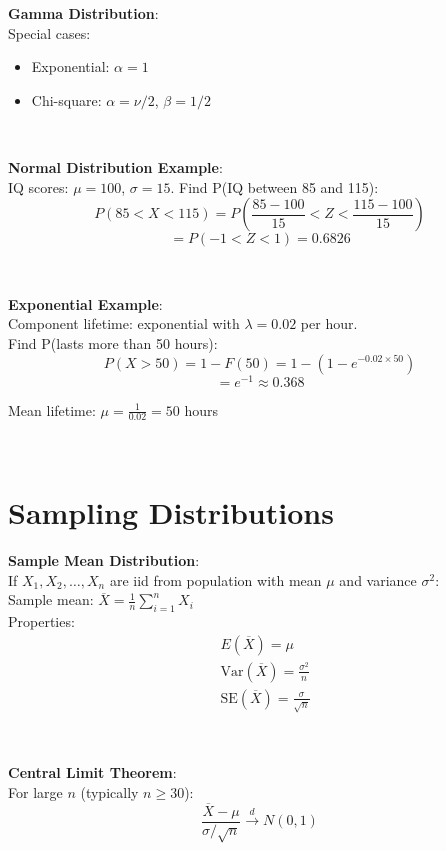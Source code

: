 \documentclass{article}
\newenvironment{cheatformula}[1][Title]{
    \begin{minipage}{\linewidth}
    \textbf{#1}:\\
}{
    \end{minipage}\\[2ex]
}
\begin{document}
\begin{multicols*}{2}
\begin{cheatformula}[Gamma Distribution]
    Special cases:
    \begin{itemize}
        \item Exponential: $\alpha = 1$
        \item Chi-square: $\alpha = \nu/2$, $\beta = 1/2$
    \end{itemize}
\end{cheatformula}

\begin{cheatformula}[Normal Distribution Example]
    IQ scores: $\mu = 100$, $\sigma = 15$. Find P(IQ between 85 and 115):
    $$P(85 < X < 115) = P\left(\frac{85-100}{15} < Z < \frac{115-100}{15}\right)$$
    $$= P(-1 < Z < 1) = 0.6826$$
\end{cheatformula}

\begin{cheatformula}[Exponential Example]
    Component lifetime: exponential with $\lambda = 0.02$ per hour.\\
    Find P(lasts more than 50 hours):
    $$P(X > 50) = 1 - F(50) = 1 - (1 - e^{-0.02 \times 50})$$
    $$= e^{-1} \approx 0.368$$
    
    Mean lifetime: $\mu = \frac{1}{0.02} = 50$ hours
\end{cheatformula}

\section{Sampling Distributions}

\begin{cheatformula}[Sample Mean Distribution]
    If $X_1, X_2, \ldots, X_n$ are iid from population with mean $\mu$ and variance $\sigma^2$:\\
    Sample mean: $\overline{X} = \frac{1}{n}\sum_{i=1}^n X_i$\\
    
    Properties:
    \begin{align*}
        &E(\overline{X}) = \mu\\
        &\text{Var}(\overline{X}) = \frac{\sigma^2}{n}\\
        &\text{SE}(\overline{X}) = \frac{\sigma}{\sqrt{n}}
    \end{align*}
\end{cheatformula}

\begin{cheatformula}[Central Limit Theorem]
    For large $n$ (typically $n \geq 30$):
    $$\frac{\overline{X} - \mu}{\sigma/\sqrt{n}} \xrightarrow{d} N(0,1)$$
    

\end{cheatformula}
\end{multicols*}
\end{document}
